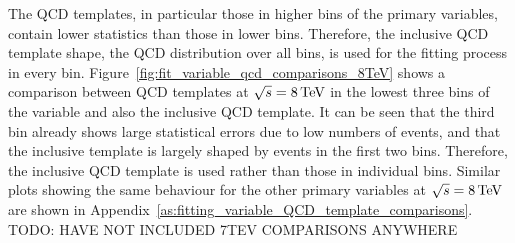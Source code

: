 \FloatBarrier

The QCD templates, in particular those in higher bins of the primary variables, contain lower statistics than
those in lower bins. Therefore, the inclusive QCD template shape, \ie the QCD distribution over all bins, is
used for the fitting process in every bin. Figure~\ref{fig:fit_variable_qcd_comparisons_8TeV} shows a
comparison between QCD templates at $\sqrt{s}=8\,\text{Te\hspace{-.08em}V}$ in the lowest three bins of the \met variable and also the
inclusive \met QCD template. It can be seen that the third \met bin already shows large statistical errors due
to low numbers of events, and that the inclusive template is largely shaped by events in the first two bins.
Therefore, the inclusive QCD template is used rather than those in individual bins. Similar plots showing the
same behaviour for the other primary variables at $\sqrt{s}=8\,\text{Te\hspace{-.08em}V}$ are shown in
Appendix~\ref{as:fitting_variable_QCD_template_comparisons}.
TODO: HAVE NOT INCLUDED 7TEV COMPARISONS ANYWHERE %

